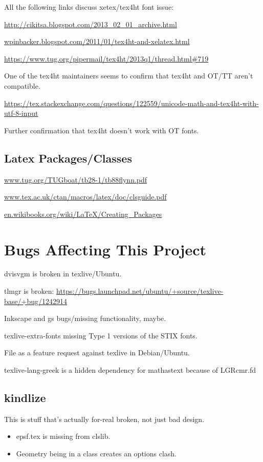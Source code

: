 \documentclass[12pt]{article}
\begin{document}
All the following links discuss xetex/tex4ht font issue:

\url{
http://cikitsa.blogspot.com/2013_02_01_archive.html
}

\url{
wpinbacker.blogspot.com/2011/01/tex4ht-and-xelatex.html‎
}

\url{
https://www.tug.org/pipermail/tex4ht/2013q1/thread.html#719
}

One of the tex4ht maintainers seems to confirm that tex4ht and OT/TT
aren't compatible.

\url{
https://tex.stackexchange.com/questions/122559/unicode-math-and-tex4ht-with-utf-8-input
}

Further confirmation that tex4ht doesn't work with OT fonts.


\subsection{Latex Packages/Classes}
\label{sec:packages_classes}

\url{
www.tug.org/TUGboat/tb28-1/tb88flynn.pdf‎
}

\url{
www.tex.ac.uk/ctan/macros/latex/doc/clsguide.pdf
}

\url{
en.wikibooks.org/wiki/LaTeX/Creating_Packages‎
}


\section{Bugs Affecting This Project}
\label{sec:bugs}

dvisvgm is broken in texlive/Ubuntu.

tlmgr is broken: \url{https://bugs.launchpad.net/ubuntu/+source/texlive-base/+bug/1242914}

Inkscape and gs bugs/missing functionality, maybe.

texlive-extra-fonts missing Type 1 versions of the STIX fonts.

File as a feature request against texlive in Debian/Ubuntu.

texlive-lang-greek is a hidden dependency for mathastext because of
LGRcmr.fd

\subsection{kindlize}
\label{sec:kindlize_bugs}

This is stuff that's actually for-real broken, not just bad design.

\begin{itemize}
\item epsf.tex is missing from clslib.
\item Geometry being in a class creates an options clash.
\end{itemize}
\end{document}
